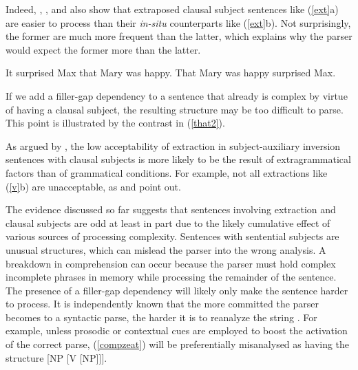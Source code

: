 \documentclass[output=paper
 	        ,biblatex
                ,babelshorthands
                ,newtxmath
                ,draftmode
                ,colorlinks, citecolor=brown
]{langscibook}
\begin{document}
\eal  \label{exps}
\zl


\noindent
Indeed, \citet{fodor67}, \citet{bever}, and \citet{frazier88} also show that extraposed clausal
subject sentences like (\ref{ext}a) are easier to process than their \textit{in-situ} counterparts
like (\ref{ext}b).  Not surprisingly, the former are much more frequent than the latter, which
explains why the parser would expect the former more than the latter.


\eal  \label{ext}
\ex It surprised Max that Mary was happy. 
\ex That Mary was happy surprised Max.
\zl

  
If we add a filler-gap dependency to a sentence that already is complex by virtue of having a
clausal subject, the resulting structure may be too difficult to parse.  This point is illustrated
by the contrast in (\ref{that2}).



\eal \label{that2}
\zl


\noindent
As argued by \citet{dubinsky2009}, the low acceptability of extraction in subject-auxiliary
inversion sentences with clausal subjects is more likely to be the result of extragrammatical
factors than of grammatical conditions.  For example, not all extractions like (\ref{v}b) are
unacceptable, as \citet[382--387]{delahunty} and \citet[115]{dubinsky2009} point out.

\eal \label{v}
\zl

The evidence discussed so far suggests that sentences involving extraction and clausal subjects are
odd at least in part due to the likely cumulative effect of various sources of processing
complexity.  Sentences with sentential subjects are unusual structures, which can mislead the parser
into the wrong analysis. A breakdown in comprehension can occur because the parser must hold complex
incomplete phrases in memory while processing the remainder of the sentence. The presence of a
filler-gap dependency will likely only make the sentence harder to process.  It is independently
known that the more committed the parser becomes to a syntactic parse, the harder it is to reanalyze
the string \citep{ferreirahend,ferreirahend2,tabor3}.  For example, unless prosodic or contextual
cues are employed to boost the activation of the correct parse, (\ref{compzeat}) will be
preferentially misanalysed as having the structure [NP [V [NP]]].
\end{document}
